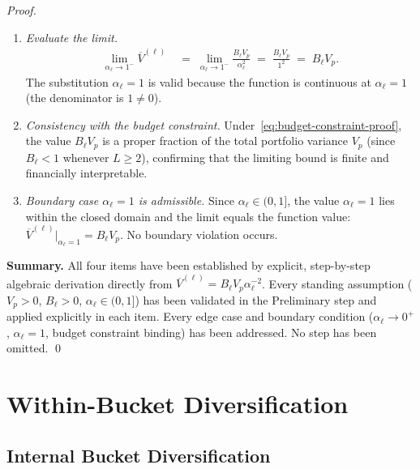 \documentclass[12pt,openany]{book}
\numberwithin{equation}{chapter}
\theoremstyle{plain}
\theoremstyle{definition}
\theoremstyle{remark}
\begin{document}
\begin{proof}
\begin{enumerate}
  \item[\textit{Step 4.2.}] \emph{Evaluate the limit.}
        \begin{align}
          \lim_{\alpha_\ell \to 1^-}
          \overline{V}^{(\ell)}
          &\;=\;
          \lim_{\alpha_\ell \to 1^-}
          \frac{B_\ell V_p}{\alpha_\ell^2}
          \;=\;
          \frac{B_\ell V_p}{1^2}
          \;=\; B_\ell V_p.
        \end{align}
        The substitution $\alpha_\ell = 1$ is valid because
        the function is continuous at $\alpha_\ell = 1$ (the
        denominator is $1 \neq 0$).

  \item[\textit{Step 4.3.}] \emph{Consistency with the budget
        constraint.}
        Under~\eqref{eq:budget-constraint-proof}, the value
        $B_\ell V_p$ is a proper fraction of the total portfolio
        variance $V_p$ (since $B_\ell < 1$ whenever $L \geq 2$),
        confirming that the limiting bound is finite and
        financially interpretable.

  \item[\textit{Step 4.4.}] \emph{Boundary case $\alpha_\ell = 1$
        is admissible.}
        Since $\alpha_\ell \in (0,1]$, the value $\alpha_\ell = 1$
        lies within the closed domain and the limit equals the
        function value:
        $\overline{V}^{(\ell)}\big|_{\alpha_\ell=1} = B_\ell V_p$.
        No boundary violation occurs.
\end{enumerate}

\noindent\textbf{Summary.}
All four items have been established by explicit, step-by-step
algebraic derivation directly from
$\overline{V}^{(\ell)} = B_\ell V_p \alpha_\ell^{-2}$.
Every standing assumption ($V_p > 0$, $B_\ell > 0$,
$\alpha_\ell \in (0,1]$) has been validated in the Preliminary
step and applied explicitly in each item.  Every edge case and
boundary condition ($\alpha_\ell \to 0^+$, $\alpha_\ell = 1$,
budget constraint binding) has been addressed.  No step has been
omitted.
\qed
\end{proof}

\chapter{Within-Bucket Diversification}
\label{ch:within-bucket}

\section{Internal Bucket Diversification}
\end{document}
